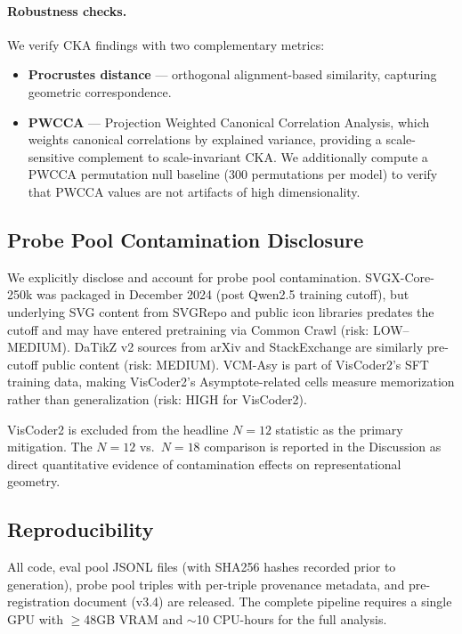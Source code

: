 \paragraph{Robustness checks.}
We verify CKA findings with two complementary metrics:
\begin{itemize}
    \item \textbf{Procrustes distance} --- orthogonal alignment-based similarity, capturing geometric correspondence.
    \item \textbf{PWCCA} \cite{morcos2018pwcca} --- Projection Weighted Canonical Correlation Analysis, which weights canonical correlations by explained variance, providing a scale-sensitive complement to scale-invariant CKA.
    We additionally compute a PWCCA permutation null baseline (300 permutations per model) to verify that PWCCA values are not artifacts of high dimensionality.
\end{itemize}

\subsection{Probe Pool Contamination Disclosure}
\label{sec:contamination}

We explicitly disclose and account for probe pool contamination.
SVGX-Core-250k was packaged in December 2024 (post Qwen2.5 training cutoff), but underlying SVG content from SVGRepo and public icon libraries predates the cutoff and may have entered pretraining via Common Crawl (risk: LOW--MEDIUM).
DaTikZ v2 sources from arXiv and StackExchange are similarly pre-cutoff public content (risk: MEDIUM).
VCM-Asy is part of VisCoder2's SFT training data, making VisCoder2's Asymptote-related cells measure memorization rather than generalization (risk: HIGH for VisCoder2).

VisCoder2 is excluded from the headline $N{=}12$ statistic as the primary mitigation.
The $N{=}12$ vs.\ $N{=}18$ comparison is reported in the Discussion as direct quantitative evidence of contamination effects on representational geometry.

\subsection{Reproducibility}

All code, eval pool JSONL files (with SHA256 hashes recorded prior to generation), probe pool triples with per-triple provenance metadata, and pre-registration document (v3.4) are released.
The complete pipeline requires a single GPU with $\geq$48GB VRAM and ${\sim}$10 CPU-hours for the full analysis.
